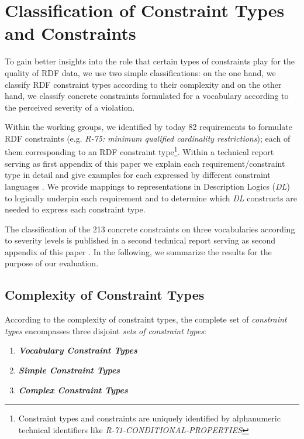\documentclass{llncs}
\begin{document}
\section{Classification of Constraint Types and Constraints}
\label{classification}

To gain better insights into the role that certain types of constraints play for the quality of RDF data, we use two simple classifications: on the one hand, we classify RDF constraint types according to their complexity and on the other hand, we classify concrete constraints formulated for a vocabulary according to the perceived severity of a violation. 

Within the working groups, we identified by today 82 requirements to formulate RDF constraints (e.g. \emph{R-75: minimum qualified cardinality restrictions}); each of them corresponding to an RDF constraint type\footnote{Constraint types and constraints are uniquely identified by alphanumeric technical identifiers like \emph{R-71-CONDITIONAL-PROPERTIES}}. 
Within a technical report serving as first appendix of this paper we explain each requirement/constraint type in detail and give examples for each expressed by different constraint languages \cite{BoschNolleAcarEckert2015}. We provide mappings to representations in Description Logics (\emph{DL}) to logically underpin each requirement and to determine which \emph{DL} constructs are needed to express each constraint type.




The classification of the 213 concrete constraints on three vocabularies according to severity levels is published in a second technical report serving as second appendix of this paper \cite{BoschZapilkoWackerowEckert2015}.
In the following, we summarize the results for the purpose of our evaluation.

\subsection{Complexity of Constraint Types}

According to the complexity of constraint types, the complete set of \emph{constraint types} encompasses three disjoint \emph{sets of constraint types}:
\begin{enumerate}
	\item \textbf{\emph{Vocabulary Constraint Types}}
	\item \textbf{\emph{Simple Constraint Types}}
	\item \textbf{\emph{Complex Constraint Types}}
\end{enumerate}
\end{document}
